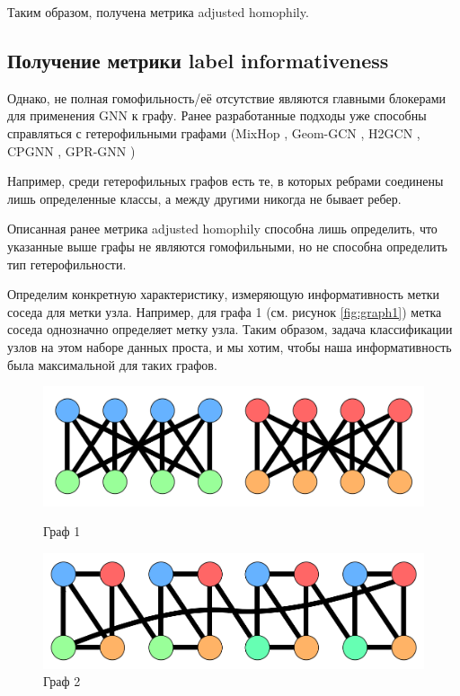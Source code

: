 \documentclass[a4paper,14pt]{article}
\begin{document}
	Таким образом, получена метрика adjusted homophily.
	
	\subsection{Получение метрики label informativeness}
	
	Однако, не полная гомофильность/её отсутствие являются главными блокерами для применения GNN к графу. 
	Ранее разработанные подходы уже способны справляться с гетерофильными графами (MixHop \cite{abu2019mixhop}, Geom-GCN \cite{pei2020geom}, H2GCN \cite{zhu2020beyond}, CPGNN \cite{zhu2021graph}, GPR-GNN \cite{chien2020adaptive})
	
	
	Например, среди гетерофильных графов есть те, в которых ребрами соединены лишь определенные классы, а между другими никогда не бывает ребер.
	
	Описанная ранее метрика adjusted homophily способна лишь определить, что указанные выше графы не являются гомофильными, но не способна определить тип гетерофильности.
	
	Определим конкретную характеристику, измеряющую информативность метки соседа для метки узла.
	Например, для графа 1 (см. рисунок \ref{fig:graph1}) метка соседа однозначно определяет метку узла.
	Таким образом, задача классификации узлов на этом наборе данных проста, и мы хотим, чтобы наша информативность была максимальной для таких графов.
	
	\begin{figure}[H]
		\centering
		\hfill
		\begin{minipage}[b]{0.4\textwidth}
			\includegraphics[width=\textwidth]{images/graph_1}
			\caption{Граф 1}
			\label{fig:graph1}
		\end{minipage}
		\hfill
		\begin{minipage}[b]{0.4\textwidth}
			\includegraphics[width=\textwidth]{images/graph_2}
			\caption{Граф 2}
			\label{fig:graph2}
		\end{minipage}
	\hfill
	\end{figure}
	
\end{document}
